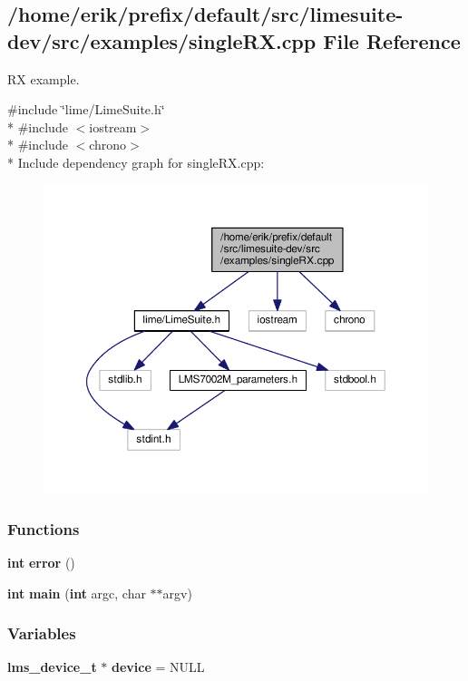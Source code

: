 \subsection{/home/erik/prefix/default/src/limesuite-\/dev/src/examples/single\+RX.cpp File Reference}
\label{singleRX_8cpp}


RX example.  


{\ttfamily \#include \char`\"{}lime/\+Lime\+Suite.\+h\char`\"{}}\\*
{\ttfamily \#include $<$iostream$>$}\\*
{\ttfamily \#include $<$chrono$>$}\\*
Include dependency graph for single\+R\+X.\+cpp\+:
\nopagebreak
\begin{figure}[H]
\begin{center}
\leavevmode
\includegraphics[width=350pt]{d3/d0f/singleRX_8cpp__incl}
\end{center}
\end{figure}
\subsubsection*{Functions}
\begin{DoxyCompactItemize}
\item 
{\bf int} {\bf error} ()
\item 
{\bf int} {\bf main} ({\bf int} argc, char $\ast$$\ast$argv)
\end{DoxyCompactItemize}
\subsubsection*{Variables}
\begin{DoxyCompactItemize}
\item 
{\bf lms\+\_\+device\+\_\+t} $\ast$ {\bf device} = N\+U\+LL
\end{DoxyCompactItemize}


